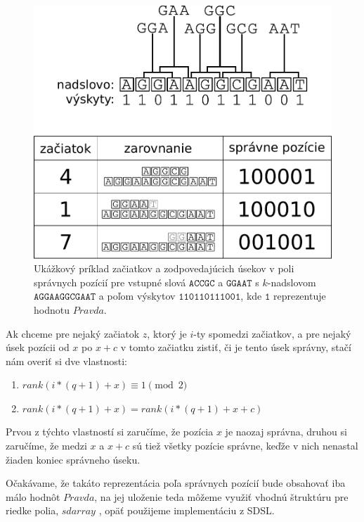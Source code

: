 \begin{figure}

\centerline{\includegraphics[width=1\textwidth]{images/zarovnanie-3-3.pdf}}

\caption[Zarovnanie a štruktúry]{Ukážkový príklad začiatkov a zodpovedajúcich úsekov v poli správnych pozícií
pre vstupné slová $\texttt{ACCGC}$ a $\texttt{GGAAT}$ s $k$-nadslovom $\texttt{AGGAAGGCGAAT}$ a poľom výskytov
$\texttt{110110111001}$, kde $\texttt{1}$ reprezentuje hodnotu $Pravda$.}

\label{obr:zar-struct}

\end{figure}


Ak chceme pre nejaký začiatok $z$, ktorý je $i$-ty spomedzi začiatkov, a pre nejaký
úsek pozícii od $x$ po $x+c$ v tomto začiatku zistiť, či je tento úsek správny,
stačí nám overiť si dve vlastnosti:
\begin{enumerate}
    \item $rank(i*(q+1) + x) \equiv 1 \pmod{2}$
    \item $rank(i*(q+1) + x) = rank(i*(q+1) + x + c)$
\end{enumerate}
Prvou z týchto vlastností si zaručíme, že pozícia $x$ je naozaj správna, druhou si
zaručíme, že medzi $x$ a $x + c$ sú tiež všetky pozície správne, keďže v nich
nenastal žiaden koniec správneho úseku.

Očakávame, že takáto reprezentácia poľa správnych pozícií bude obsahovať iba
málo hodnôt $Pravda$, na jej uloženie teda môžeme využiť vhodnú štruktúru pre
riedke polia, $sdarray$ \cite{sdarray}, opäť použijeme implementáciu z SDSL.

